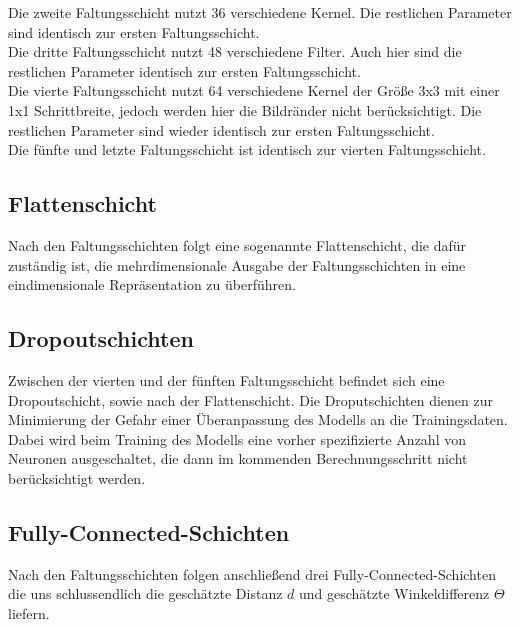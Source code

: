 Die zweite Faltungsschicht nutzt 36 verschiedene Kernel. Die restlichen Parameter sind identisch zur ersten Faltungsschicht. \\

Die dritte Faltungsschicht nutzt 48 verschiedene Filter. Auch hier sind die restlichen Parameter identisch zur ersten Faltungsschicht. \\

Die vierte Faltungsschicht nutzt 64 verschiedene Kernel der Größe 3x3 mit einer 1x1 Schrittbreite, jedoch werden hier die Bildränder nicht berücksichtigt. Die restlichen Parameter sind wieder identisch zur ersten Faltungsschicht. \\

Die fünfte und letzte Faltungsschicht ist identisch zur vierten Faltungsschicht.

\subsection{Flattenschicht}

Nach den Faltungsschichten folgt eine sogenannte Flattenschicht, die dafür zuständig ist, die mehrdimensionale Ausgabe der Faltungsschichten  in eine eindimensionale Repräsentation zu überführen. \cite{hhu}

\subsection{Dropoutschichten}

Zwischen der vierten und der fünften Faltungsschicht befindet sich eine Dropoutschicht, sowie nach der Flattenschicht. Die Droputschichten dienen zur Minimierung der Gefahr einer Überanpassung des Modells an die Trainingsdaten. Dabei wird beim Training des Modells eine vorher spezifizierte Anzahl von Neuronen ausgeschaltet, die dann im kommenden Berechnungsschritt nicht berücksichtigt werden. \cite{wiki2}

\subsection{Fully-Connected-Schichten}

Nach den Faltungsschichten folgen anschließend drei Fully-Connected-Schichten die uns schlussendlich die geschätzte Distanz $d$ und geschätzte Winkeldifferenz $\Theta$ liefern.

